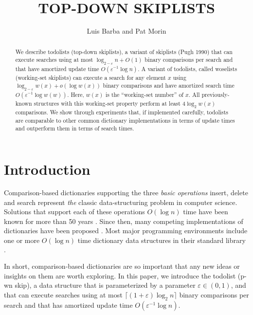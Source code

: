 \documentclass[lotsofwhite]{patmorin}
\title{\MakeUppercase{Top-Down Skiplists}}
\author{Luis Barba and Pat Morin}
\newcommand{\eps}{\varepsilon}
\begin{document}
\begin{titlepage}
\maketitle

\begin{abstract}
  We describe todolists (top-down skiplists), a variant of skiplists (Pugh
  1990) that can execute searches using at most $\log_{2-\eps}
  n + O(1)$ binary comparisons per search and that have amortized update
  time $O(\eps^{-1}\log n)$.  A variant of todolists, called woselists
  (working-set skiplists) can execute a search for any element $x$ using
  $\log_{2-\eps} w(x) + o(\log w(x))$ binary comparisons and have amortized
  search time $O(\eps^{-1}\log w(w))$.  Here, $w(x)$ is
  the ``working-set number'' of $x$.  All previously-known structures with
  this working-set property perform at least $4\log_2 w(x)$ comparisons.
  We show through experiments that, if implemented carefully, todolists
  are comparable to other common dictionary implementations in terms of
  update times and outperform them in terms of search times.
\end{abstract}

\end{titlepage}

\section{Introduction}

Comparison-based dictionaries supporting the three \emph{basic operations}
insert, delete and search represent \emph{the} classic data-structuring
problem in computer science.  Solutions that support each of these
operations $O(\log n)$ time have been known for more than 50 years
\cite{avl}.  Since then, many competing implementations of dictionaries
have been proposed \cite{X}.  Most major programming environments include
one or more $O(\log n)$ time dictionary data structures in their standard
library \cite{S}.

In short, comparison-based dictionaries are so important that any
new ideas or insights on them are worth exploring.  In this paper,
we introduce the todolist (p-wn skip),
a data structure that is parameterized by a parameter $\eps\in(0,1)$,
and that can execute searches using at most $\lceil(1+\eps)\log_2
n\rceil$ binary comparisons per search and that has amortized update time
$O(\eps^{-1}\log n)$.  
\end{document}

